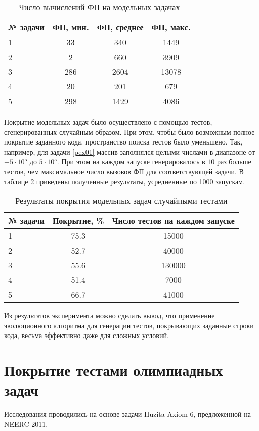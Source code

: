 \begin{table}[h!]
\caption{Число вычислений ФП на модельных задачах} \label{pexres}
\begin{tabular}{|p{5em}|c|c|c|}
\hline
№ задачи & ФП, мин. & ФП, среднее & ФП, макс. \\\hline
1  & 33  &  340 & 1449 \\\hline
2 & 2  &  660& 3909 \\\hline
3  & 286  &  2604 & 13078 \\\hline
4  & 20  &  201 & 679 \\\hline
5  & 298  &  1429 & 4086 \\\hline
\end{tabular}
\end{table}

Покрытие модельных задач было осуществлено с помощью тестов, сгенерированных случайным образом. При этом, чтобы было возможным полное покрытие заданного кода, 
пространство поиска тестов было уменьшено. Так, например, для задачи \ref{pex01} массив заполнялся целыми числами в диапазоне от $-5 \cdot 10^5$ до $5 \cdot 
10^5$. При этом на каждом запуске генерировалось в $10$ раз больше тестов, чем максимальное число вызовов ФП для соответствующей задачи. В таблице 
\ref{randompex} приведены полученные результаты, усредненные по 1000 запускам.

\begin{table}
\caption{Результаты покрытия модельных задач случайными тестами} \label{randompex}
\begin{tabular}{|p{5em}|c|c|}
\hline
№ задачи & Покрытие, \% & Число тестов на каждом запуске\\\hline
1 & 75.3 & 15000\\\hline
2 & 52.7 & 40000\\\hline
3 & 55.6 & 130000\\\hline
4 & 51.4 & 7000\\\hline
5 & 66.7 & 41000\\\hline
\end{tabular}
\end{table}

Из результатов эксперимента можно сделать вывод, что применение эволюционного алгоритма для генерации тестов, покрывающих заданные строки кода, весьма 
эффективно даже для сложных условий.

\section{Покрытие тестами олимпиадных задач}
Исследования проводились на основе задачи  Huzita Axiom 6, предложенной на NEERC 2011. 

